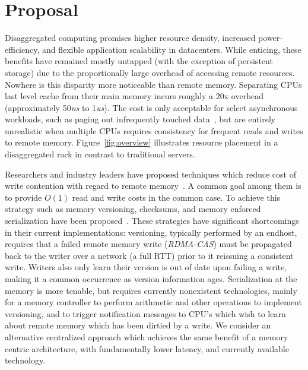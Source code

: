 \section{Proposal}
\label{sec:intro}

Disaggregated computing promises higher resource density, increased
power-efficiency, and flexible application scalability in datacenters.
While enticing, these benefits have remained mostly untapped (with the
exception of persistent storage) due to the proportionally large
overhead of accessing remote resources. Nowhere is this disparity more
noticeable than remote memory. Separating CPUs last level cache from
their main memory incurs roughly a 20x overhead (approximately
50\textit{ns} to 1\textit{us}).  The cost is only acceptable for
select asynchronous workloads, such as paging out infrequently touched
data~\cite{gms}, but are entirely unrealistic when multiple CPUs
requires consistency for frequent reads and writes to remote memory.
Figure~\ref{fig:overview} illustrates resource placement in a
disaggregated rack in contrast to traditional servers.

Researchers and industry leaders have proposed techniques which reduce
cost of write contention with regard to remote
memory~\cite{clover,aguilera2019designing,cell,storm,sonuma}. A common
goal among them is to provide $O(1)$ read and write costs in the
common case. To achieve this strategy such as memory versioning,
checksums, and memory enforced serialization have been
proposed~\cite{aguilera2019designing}. These strategies have
significant shortcomings in their current implementations: versioning,
typically performed by an endhost, requires that a failed remote
memory write (\textit{RDMA-CAS})  must be propagated back to the
writer over a network (a full RTT) prior to it reissuing a consistent
write. Writers also only learn their version is out of date upon
failing a write, making it a common occurrence as version information
ages.  Serialization at the memory is more tenable, but requires
currently nonexistent technologies, mainly for a memory controller to
perform arithmetic and other operations to implement versioning, and
to trigger notification messages to CPU's which wish to learn about
remote memory which has been dirtied by a write. We consider an
alternative centralized approach which achieves the same benefit of a
memory centric architecture, with fundamentally lower latency, and
currently available technology. 



